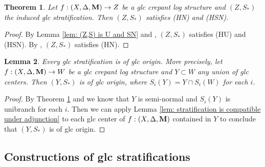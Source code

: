 \documentclass[11pt]{amsart}
\numberwithin{equation}{section}
\newcommand{\Mm}{{\bf{M}}}
\newtheorem{thm}{Theorem}[section]
\newtheorem{lem}[thm]{Lemma}
\theoremstyle{definition}
\theoremstyle{definition}
\theoremstyle{definition}
\begin{document}
\begin{thm}\label{thm: (Z,S) is HN and HSN}
Let $f:(X,\Delta,\Mm)\to Z$ be a glc crepant log structure and $(Z,S_*)$ the induced glc stratification. Then $(Z,S_*)$ satisfies (HN) and (HSN).
\end{thm}
\begin{proof}
By Lemma \ref{lem: (Z,S) is U and SN} and \cite[Definitions 9.18,~9.19]{Kol13}, $(Z,S_*)$ satisfies (HU) and (HSN). By \cite[Theorem 9.21]{Kol13}, $(Z,S_*)$  satisfies (HN).
\end{proof}

\begin{lem}\label{lem: glc stratification is of glc origin}
Every glc stratification is of glc origin. More precisely, let $f:(X,\Delta,\Mm)\to W $ be a glc crepant log structure and $Y\subset W$ any union of glc centers. Then $(Y, S_*)$ is of glc origin, where $S_i(Y)=Y\cap S_i(W)$ for each $i$.
\end{lem}

\begin{proof}
By Theorem \ref{thm: (Z,S) is HN and HSN} and \cite[Theorem 9.26]{Kol13} we know that $Y$ is semi-normal and $S_i(Y)$ is unibranch for each $i$. Then we can apply Lemma \ref{lem: stratification is compatible under adjunction} to each glc center of $f: (X,\Delta,\Mm)$ contained in $Y$ to conclude that $(Y, S_*)$ is of glc origin.
\end{proof}



\subsection{Constructions of glc stratifications}
\end{document}
